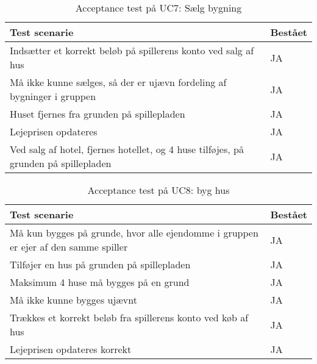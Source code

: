 \documentclass[class=article, crop=false]{standalone}
\begin{document}
    \begin{table}[H]
        \caption{Acceptance test på UC7: Sælg bygning }
        \begin{tabularx}{\textwidth}{|X|l|}
            \hline
            \textbf{Test scenarie}       & \textbf{Bestået}   \\ \hline
            Indsætter et korrekt beløb på spillerens konto ved salg af hus     & JA \\ \hline
            Må ikke kunne sælges, så der er ujævn fordeling af bygninger i gruppen    & JA \\ \hline
            Huset fjernes fra grunden på spillepladen     & JA \\ \hline
            Lejeprisen opdateres     & JA\\ \hline
            Ved salg af hotel, fjernes hotellet, og 4 huse tilføjes, på grunden på spillepladen    & JA \\ \hline
        \end{tabularx}
    \end{table}

    \begin{table}[H]
        \caption{Acceptance test på UC8: byg hus}
        \begin{tabularx}{\textwidth}{|X|l|}
            \hline
            \textbf{Test scenarie}       & \textbf{Bestået}   \\ \hline
            Må kun bygges på grunde, hvor alle ejendomme i gruppen er ejer af den samme spiller     & JA \\ \hline
            Tilføjer en hus på grunden på spillepladen     & JA\\ \hline
            Maksimum 4 huse må bygges på en grund     & JA\\ \hline
            Må ikke kunne bygges ujævnt     & JA\\ \hline
            Trækkes et korrekt beløb fra spillerens konto ved køb af hus     & JA\\ \hline
            Lejeprisen opdateres korrekt    & JA \\ \hline
        \end{tabularx}
    \end{table}
\end{document}
